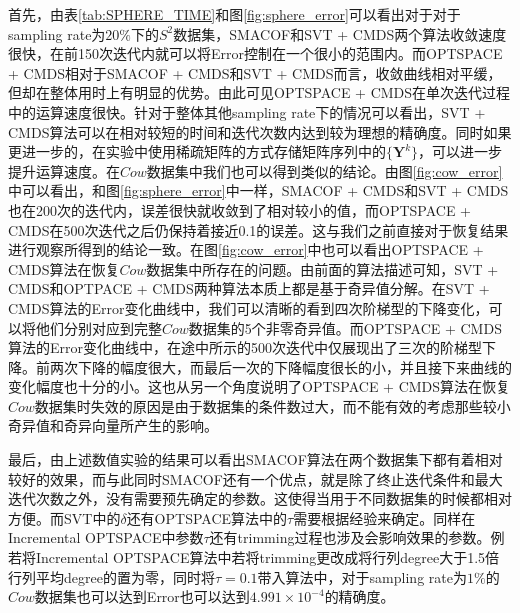 首先，由表\ref{tab:SPHERE_TIME}和图\ref{fig:sphere_error}可以看出对于对于sampling rate为$20\%$下的$S^2$数据集，SMACOF和SVT + CMDS两个算法收敛速度很快，在前150次迭代内就可以将Error控制在一个很小的范围内。而OPTSPACE + CMDS相对于SMACOF + CMDS和SVT + CMDS而言，收敛曲线相对平缓，但却在整体用时上有明显的优势。由此可见OPTSPACE + CMDS在单次迭代过程中的运算速度很快。针对于整体其他sampling rate下的情况可以看出，SVT + CMDS算法可以在相对较短的时间和迭代次数内达到较为理想的精确度。同时如果更进一步的，在实验中使用稀疏矩阵的方式存储矩阵序列中的$\{\mathbf{Y}^k\}$，可以进一步提升运算速度。在$Cow$数据集中我们也可以得到类似的结论。由图\ref{fig:cow_error}中可以看出，和图\ref{fig:sphere_error}中一样，SMACOF + CMDS和SVT + CMDS也在200次的迭代内，误差很快就收敛到了相对较小的值，而OPTSPACE + CMDS在500次迭代之后仍保持着接近0.1的误差。这与我们之前直接对于恢复结果进行观察所得到的结论一致。在图\ref{fig:cow_error}中也可以看出OPTSPACE + CMDS算法在恢复$Cow$数据集中所存在的问题。由前面的算法描述可知，SVT + CMDS和OPTPACE + CMDS两种算法本质上都是基于奇异值分解。在SVT + CMDS算法的Error变化曲线中，我们可以清晰的看到四次阶梯型的下降变化，可以将他们分别对应到完整$Cow$数据集的5个非零奇异值。而OPTSPACE + CMDS算法的Error变化曲线中，在途中所示的500次迭代中仅展现出了三次的阶梯型下降。前两次下降的幅度很大，而最后一次的下降幅度很长的小，并且接下来曲线的变化幅度也十分的小。这也从另一个角度说明了OPTSPACE + CMDS算法在恢复$Cow$数据集时失效的原因是由于数据集的条件数过大，而不能有效的考虑那些较小奇异值和奇异向量所产生的影响。




最后，由上述数值实验的结果可以看出SMACOF算法在两个数据集下都有着相对较好的效果，而与此同时SMACOF还有一个优点，就是除了终止迭代条件和最大迭代次数之外，没有需要预先确定的参数。这使得当用于不同数据集的时候都相对方便。而SVT中的$\delta$还有OPTSPACE算法中的$\tau$需要根据经验来确定。同样在Incremental OPTSPACE中参数$\tau$还有trimming过程也涉及会影响效果的参数。例若将Incremental OPTSPACE算法中若将trimming更改成将行列degree大于1.5倍行列平均degree的置为零，同时将$\tau = 0.1$带入算法中，对于sampling rate为$1\%$的$Cow$数据集也可以达到Error也可以达到$4.991\times10^{-4}$的精确度。